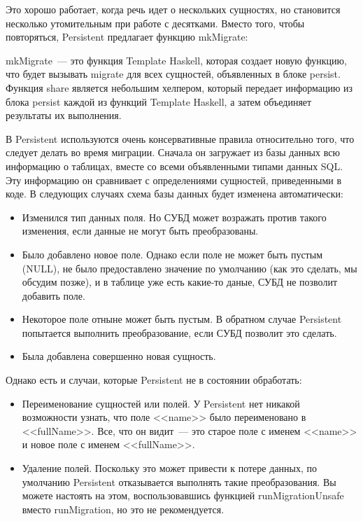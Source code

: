 Это хорошо работает, когда речь идет о нескольких сущностях, но становится несколько утомительным при работе с десятками. Вместо того, чтобы повторяться, Persistent предлагает функцию mkMigrate:


mkMigrate~--- это функция Template Haskell, которая создает новую функцию, что будет вызывать migrate для всех сущностей, объявленных в блоке persist. Функция share является небольшим хелпером, который передает информацию из блока persist каждой из функций Template Haskell, а затем объединяет результаты их выполнения.

В Persistent используются очень консервативные правила относительно того, что следует делать во время миграции. Сначала он загружает из базы данных всю информацию о таблицах, вместе со всеми объявленными типами данных SQL. Эту информацию он сравнивает с определениями сущностей, приведенными в коде. В следующих случаях схема базы данных будет изменена автоматически:

\begin{itemize}
	\item Изменился тип данных поля. Но СУБД может возражать против такого изменения, если данные не могут быть преобразованы.
	\item Было добавлено новое поле. Однако если поле не может быть пустым (NULL), не было предоставлено значение по умолчанию (как это сделать, мы обсудим позже), и в таблице уже есть какие-то даные, СУБД не позволит добавить поле.
	\item Некоторое поле отныне может быть пустым. В обратном случае Persistent попытается выполнить преобразование, если СУБД позволит это сделать.
	\item Была добавлена совершенно новая сущность.
\end{itemize}

Однако есть и случаи, которые Persistent не в состоянии обработать:

\begin{itemize}
	\item Переименование сущностей или полей. У Persistent нет никакой возможности узнать, что поле <<name>> было переименовано в <<fullName>>. Все, что он видит~--- это старое поле с именем <<name>> и новое поле с именем <<fullName>>.
	\item Удаление полей. Поскольку это может привести к потере данных, по умолчанию Persistent отказывается выполнять такие преобразования. Вы можете настоять на этом, воспользовавшись функцией runMigrationUnsafe вместо runMigration, но это не рекомендуется.
\end{itemize}

